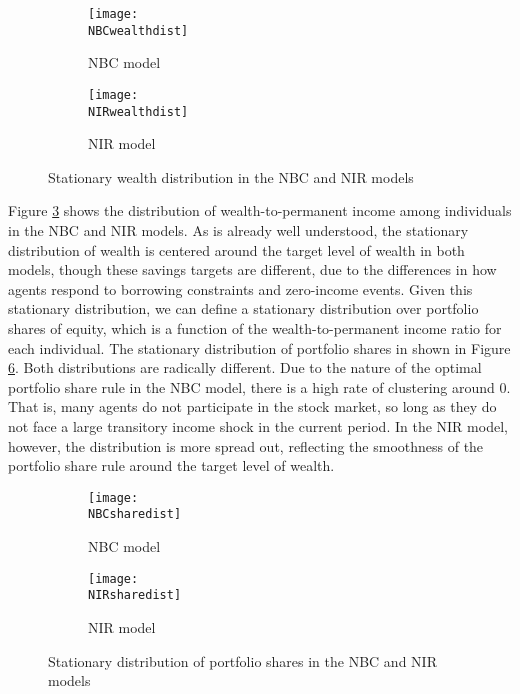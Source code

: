 \begin{figure}[h]
    \centering
    \begin{subfigure}{0.49\textwidth}
        \centering
        \texttt{[image: \\NBCwealthdist]}
        \caption{NBC model}
        \label{subfig:NBCwealthdist}
    \end{subfigure}
    \begin{subfigure}{0.49\textwidth}
        \centering
        \texttt{[image: \\NIRwealthdist]}
        \caption{NIR model}
        \label{subfig:NIRwealthdist}
    \end{subfigure}
    \caption{Stationary wealth distribution in the NBC and NIR models}
    \label{fig:wealthdist}
\end{figure}
Figure \ref{fig:wealthdist} shows the distribution of wealth-to-permanent income among individuals in the NBC and NIR models. As is already well understood, the stationary distribution of wealth is centered around the target level of wealth in both models, though these savings targets are different, due to the differences in how agents respond to borrowing constraints and zero-income events. Given this stationary distribution, we can define a stationary distribution over portfolio shares of equity, which is a function of the wealth-to-permanent income ratio for each individual. The stationary distribution of portfolio shares in shown in Figure \ref{fig:sharedist}. Both distributions are radically different. Due to the nature of the optimal portfolio share rule in the NBC model, there is a high rate of clustering around 0. That is, many agents do not participate in the stock market, so long as they do not face a large transitory income shock in the current period. In the NIR model, however, the distribution is more spread out, reflecting the smoothness of the portfolio share rule around the target level of wealth.
\begin{figure}[h]
    \centering
    \begin{subfigure}{0.49\textwidth}
        \centering
        \texttt{[image: \\NBCsharedist]}
        \caption{NBC model}
        \label{subfig:NBCsharedist}
    \end{subfigure}
    \begin{subfigure}{0.49\textwidth}
        \centering
        \texttt{[image: \\NIRsharedist]}
        \caption{NIR model}
        \label{subfig:NIRsharedist}
    \end{subfigure}
    \caption{Stationary distribution of portfolio shares in the NBC and NIR models}
    \label{fig:sharedist}
\end{figure}
